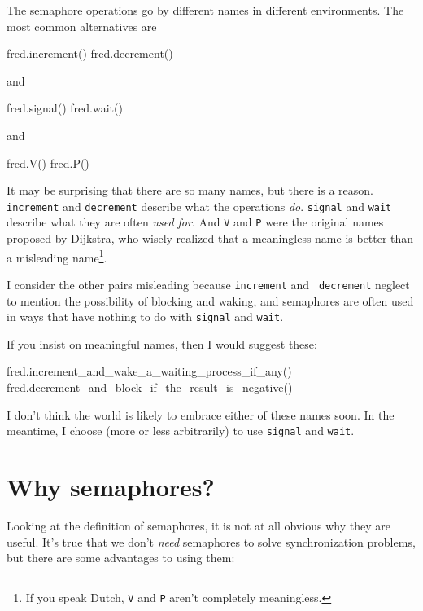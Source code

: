 \documentclass{book}
\begin{document}
The semaphore operations go by different names in different environments.
The most common alternatives are

\begin{unbreakable}[title={Semaphore operations}]{}
fred.increment()
fred.decrement()	
\end{unbreakable}

and

\begin{unbreakable}[title={Semaphore operations}]{}
fred.signal()
fred.wait()	
\end{unbreakable}

and

\begin{unbreakable}[title={Semaphore operations}]{}
fred.V()
fred.P()	
\end{unbreakable}

It may be surprising that there are so many names, but there is a
reason.  {\tt increment} and {\tt decrement}
describe what the operations {\em do}.  {\tt signal} and {\tt wait}
describe what they are often {\em used for}.  And {\tt V} and {\tt P} were
the original names proposed by Dijkstra, who wisely realized that a
meaningless name is better than a misleading name\footnote{If you speak
    Dutch, {\tt V} and {\tt P} aren't completely meaningless.}.

I consider the other pairs misleading because {\tt increment} and {\tt
        decrement} neglect to mention the possibility of blocking and waking,
and semaphores are often used in ways that have nothing to do with
    {\tt signal} and {\tt wait}.

If you insist on meaningful names, then I would suggest these:

\begin{unbreakable}[basicstyle=\tiny,title={Semaphore operations}]
fred.increment_and_wake_a_waiting_process_if_any()
fred.decrement_and_block_if_the_result_is_negative()	
\end{unbreakable}

I don't think the world is likely to embrace either of these names
soon.  In the meantime, I choose (more or less arbitrarily) to use
    {\tt signal} and {\tt wait}.


\section{Why semaphores?}

Looking at the definition of semaphores, it is not at all obvious why
they are useful.  It's true that we don't {\em need} semaphores to
solve synchronization problems, but there are some advantages to using
them:
\end{document}
